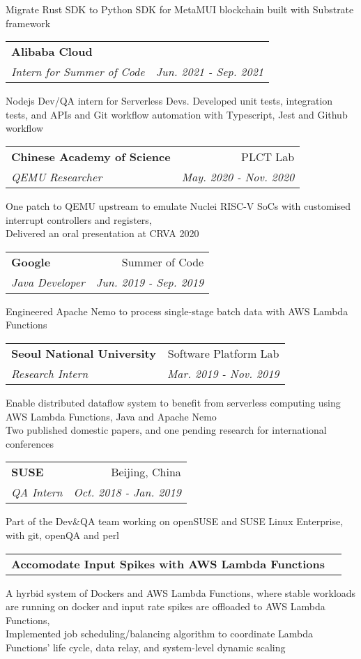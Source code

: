 \documentclass[letterpaper,11pt]{article}
\makeatletter
\renewenvironment{itemize}{
  \begin{list}{}{
    \setlength{\leftmargin}{0.6em}
    \setlength{\textwidth}{7.5in}
    \setlength{\topmargin}{-0.6in}
    \setlength{\textheight}{19.5in}
  }
}{
  \end{list}
}
\newcommand{\resitem}[1]{\item #1 \vspace{-2pt}}
\newcommand{\resheading}[1]{{\large \parashade[.9]{sharpcorners}{\textbf{#1 \vphantom{p\^{E}}}}}}
\newcommand{\ressubheading}[4]{
\begin{tabular*}{6.5in}{l@{\extracolsep{\fill}}r}
		\textbf{#1} & #2 \\
		\textit{#3} & \textit{#4} \\
\end{tabular*}\vspace{-8.5pt}} %
\newcommand{\ressubheadingtiny}[1]{
\begin{tabular*}{6.5in}{l@{\extracolsep{\fill}}r}
		\textbf{#1} \\
\end{tabular*}\vspace{-8.5pt}} %
\makeatother
\begin{document}
\begin{itemize}
	\begin{itemize}
		\resitem{Migrate Rust SDK to Python SDK for MetaMUI blockchain built with Substrate framework}
	\end{itemize}
        \ressubheading{Alibaba Cloud}{}{Intern for Summer of Code}{Jun. 2021 - Sep. 2021}
        \begin{itemize}
                \resitem{Nodejs Dev/QA intern for Serverless Devs. Developed unit tests, integration tests, and APIs and Git workflow automation with Typescript, Jest and Github workflow}
        \end{itemize}
\item
	\ressubheading{Chinese Academy of Science}{PLCT Lab}{QEMU Researcher}{May. 2020 - Nov. 2020}
	\begin{itemize}
		\resitem{One patch to QEMU upstream to emulate Nuclei RISC-V SoCs with customised interrupt controllers and registers, \\
			Delivered an oral presentation at CRVA 2020}
	\end{itemize}
\item
	\ressubheading{Google}{Summer of Code}{Java Developer}{Jun. 2019 - Sep. 2019}
	\begin{itemize}
		\resitem{Engineered Apache Nemo to process single-stage batch data with AWS Lambda Functions}
	\end{itemize}
\item
	\ressubheading{Seoul National University}{Software Platform Lab}{Research Intern}{Mar. 2019 - Nov. 2019}
	\begin{itemize}
		\resitem{Enable distributed dataflow system to benefit from serverless computing using AWS Lambda Functions, Java and Apache Nemo \\
			Two published domestic papers, and one pending research for international conferences}
	\end{itemize}
\item
	\ressubheading{SUSE}{Beijing, China}{QA Intern}{Oct. 2018 - Jan. 2019}
	\begin{itemize}
			\resitem{Part of the Dev\&QA team working on openSUSE and SUSE Linux Enterprise, with git, openQA and perl}
	\end{itemize}

\end{itemize}


\resheading{Research Project}
\begin{itemize}
\item
	\ressubheadingtiny{Accomodate Input Spikes with AWS Lambda Functions}
	\begin{itemize}
		\resitem{
			A hyrbid system of Dockers and AWS Lambda Functions, where stable workloads are running on docker and input rate spikes are offloaded to AWS Lambda Functions, \\
			Implemented job scheduling/balancing algorithm to coordinate Lambda Functions' life cycle, data relay, and system-level dynamic scaling }
	\end{itemize}
\end{itemize}
\end{document}
